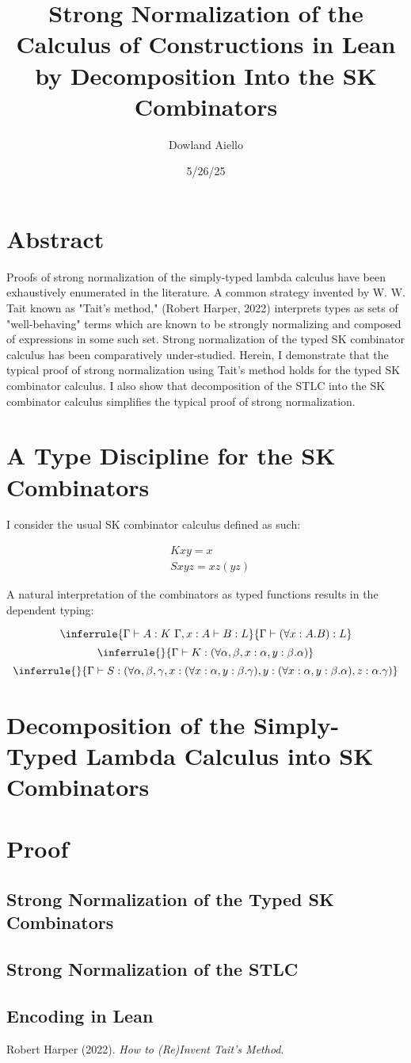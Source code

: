 \documentclass[11pt]{article}
\author{Dowland Aiello}
\date{5/26/25}
\title{Strong Normalization of the Calculus of Constructions in Lean by Decomposition Into the SK Combinators}
\begin{document}
\maketitle
\tableofcontents

\section{Abstract}
\label{sec:orgfa53a36}

Proofs of strong normalization of the simply-typed lambda calculus have been exhaustively enumerated in the literature. A common strategy invented by W. W. Tait known as "Tait's method," (Robert Harper, 2022) interprets types as sets of "well-behaving" terms which are known to be strongly normalizing and composed of expressions in some such set.
Strong normalization of the typed SK combinator calculus has been comparatively under-studied. Herein, I demonstrate that the typical proof of strong normalization using Tait's method holds for the typed SK combinator calculus. I also show that decomposition of the STLC into the SK combinator calculus simplifies the typical proof of strong normalization.
\section{A Type Discipline for the SK Combinators}
\label{sec:org5830a48}

I consider the usual SK combinator calculus defined as such:

\begin{align}
& K xy = x \\
& S xyz = xz (yz)
\end{align}

A natural interpretation of the combinators as typed functions results in the dependent typing:

\[
\inferrule
  { \Gamma \vdash A : K \ \Gamma,x : A \vdash B : L }
  { \Gamma \vdash (\forall x : A.B) : L}
\]
\[
\inferrule
  { }
  { \Gamma \vdash K : (\forall \alpha, \beta, x : \alpha, y : \beta.\alpha) }
\]
\[
\inferrule
  { }
  { \Gamma \vdash S : (\forall \alpha, \beta, \gamma, x : (\forall x : \alpha, y : \beta.\gamma), y : (\forall x : \alpha, y : \beta.\alpha), z : \alpha.\gamma) }
\]
\section{Decomposition of the Simply-Typed Lambda Calculus into SK Combinators}
\label{sec:org6ddaecc}
\section{Proof}
\label{sec:org9667325}
\subsection{Strong Normalization of the Typed SK Combinators}
\label{sec:orgb639c79}
\subsection{Strong Normalization of the STLC}
\label{sec:org00698be}
\subsection{Encoding in Lean}
\label{sec:orgee154cd}

\noindent
Robert Harper (2022). \emph{How to (Re)Invent Tait’s Method}.
\end{document}
